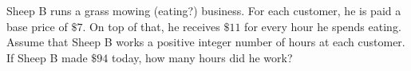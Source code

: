 Sheep B runs a grass mowing (eating?) business. For each customer, he is paid a base price of $\$7$. On top of that, he receives $\$11$ for every hour he spends eating. Assume that Sheep B works a positive integer number of hours at each customer. If Sheep B made $\$94$ today, how many hours did he work?
